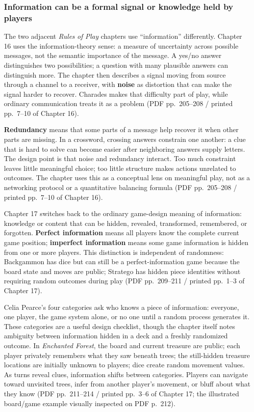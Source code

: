 \subsubsection{Information can be a formal signal or knowledge held by players}\label{05-engine-i-ch009-information-can-be-a-formal-signal-or-knowledge-held-by-players}

The two adjacent \emph{Rules of Play} chapters use ``information'' differently. Chapter 16 uses the information-theory sense: a measure of uncertainty across possible messages, not the semantic importance of the message. A yes/no answer distinguishes two possibilities; a question with many plausible answers can distinguish more. The chapter then describes a signal moving from source through a channel to a receiver, with \textbf{noise} as distortion that can make the signal harder to recover. Charades makes that difficulty part of play, while ordinary communication treats it as a problem (PDF pp.~205--208 / printed pp.~7--10 of Chapter 16).

\textbf{Redundancy} means that some parts of a message help recover it when other parts are missing. In a crossword, crossing answers constrain one another: a clue that is hard to solve can become easier after neighboring answers supply letters. The design point is that noise and redundancy interact. Too much constraint leaves little meaningful choice; too little structure makes actions unrelated to outcomes. The chapter uses this as a conceptual lens on meaningful play, not as a networking protocol or a quantitative balancing formula (PDF pp.~205--208 / printed pp.~7--10 of Chapter 16).

Chapter 17 switches back to the ordinary game-design meaning of information: knowledge or content that can be hidden, revealed, transformed, remembered, or forgotten. \textbf{Perfect information} means all players know the complete current game position; \textbf{imperfect information} means some game information is hidden from one or more players. This distinction is independent of randomness: Backgammon has dice but can still be a perfect-information game because the board state and moves are public; Stratego has hidden piece identities without requiring random outcomes during play (PDF pp.~209--211 / printed pp.~1--3 of Chapter 17).

Celia Pearce's four categories ask who knows a piece of information: everyone, one player, the game system alone, or no one until a random process generates it. These categories are a useful design checklist, though the chapter itself notes ambiguity between information hidden in a deck and a freshly randomized outcome. In \emph{Enchanted Forest}, the board and current treasure are public; each player privately remembers what they saw beneath trees; the still-hidden treasure locations are initially unknown to players; dice create random movement values. As turns reveal clues, information shifts between categories. Players can navigate toward unvisited trees, infer from another player's movement, or bluff about what they know (PDF pp.~211--214 / printed pp.~3--6 of Chapter 17; the illustrated board/game example visually inspected on PDF p.~212).

